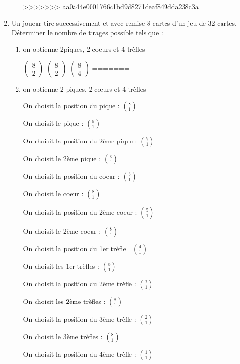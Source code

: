\documentclass[a4paper,10pt]{article}
\begin{document}
\begin{enumerate}
\begin{enumerate}
		
>>>>>>> aa0a44e0001766c1bd9d8271deaf849dda238c3a
		\end{enumerate}
	
	\item Un joueur tire successivement et avec remise 8 cartes d'un jeu de 32 cartes. Déterminer le nombre de tirages possible tels que :
		\begin{enumerate}
<<<<<<< HEAD
		\item on obtienne 2piques, 2 coeurs et 4 trèfles
		
		$\left(\begin{array}{c} 8 \\ 2 \end{array} \right)$
		$\left(\begin{array}{c} 8 \\ 2 \end{array} \right)$
		$\left(\begin{array}{c} 8 \\ 4 \end{array} \right)$
=======
		\item on obtienne 2 piques, 2 cœurs et 4 trèfles

		
		On choisit la position du pique :
		$\binom{8}{1}$
		
		On choisit le pique :
		$\binom{8}{1}$
		
		On choisit la position du 2ème pique :
		$\binom{7}{1}$
		
		On choisit le 2ème pique :
		$\binom{8}{1}$
		
		On choisit la position du coeur :
		$\binom{6}{1}$
		
		On choisit le coeur :
		$\binom{8}{1}$
		
		On choisit la position du 2ème coeur :
		$\binom{5}{1}$
		
		On choisit le 2ème coeur :
		$\binom{8}{1}$
		
		On choisit la position du 1er trèfle :
		$\binom{4}{1}$
		
		On choisit les 1er trèfles :		
		$\binom{8}{1}$
		
		On choisit la position du 2ème trèfle :
		$\binom{3}{1}$
		
		On choisit les 2ème trèfles :		
		$\binom{8}{1}$
		
		On choisit la position du 3ème trèfle :
		$\binom{2}{1}$
		
		On choisit le 3ème trèfles :		
		$\binom{8}{1}$
		
		On choisit la position du 4ème trèfle :
		$\binom{1}{1}$
		

\end{enumerate}
\end{enumerate}
\end{document}
